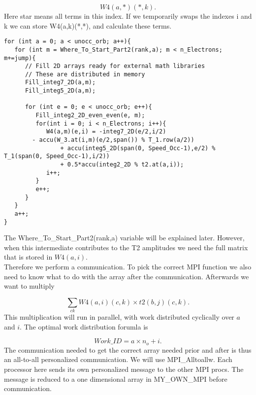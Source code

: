 \begin{equation}
W4(a,*)(*,k) .
\end{equation}
Here star means all terms in this index. If we temporarily swaps the indexes i and k we can store W4(a,k)(*,*), and calculate these terms.

\begin{lstlisting}
for (int a = 0; a < unocc_orb; a++){
   for (int m = Where_To_Start_Part2(rank,a); m < n_Electrons; m+=jump){
      // Fill 2D arrays ready for external math libraries
      // These are distributed in memory
      Fill_integ7_2D(a,m);
      Fill_integ5_2D(a,m);

      for (int e = 0; e < unocc_orb; e++){
         Fill_integ2_2D_even_even(e, m);
         for(int i = 0; i < n_Electrons; i++){
            W4(a,m)(e,i) = -integ7_2D(e/2,i/2)
        - accu(W_3.at(i,m)(e/2,span()) % T_1.row(a/2))
                + accu(integ5_2D(span(0, Speed_Occ-1),e/2) % T_1(span(0, Speed_Occ-1),i/2))
                + 0.5*accu(integ2_2D % t2.at(a,i));
            i++;
         }
         e++;
      }
   }
   a++;
}
\end{lstlisting}

The Where\_To\_Start\_Part2(rank,a) variable will be explained later. However, when this intermediate contributes to the T2 amplitudes we need the full matrix that is stored in $W4(a,i)$. \\

Therefore we perform a communication. To pick the correct MPI function we also need to know what to do with the array after the communication. Afterwards we want to multiply

\begin{equation}
\sum_{ck} W4(a,i)(c,k) \times t2(b,j)(c,k)   .\label{gasghashkashfbdbhcxxcnxcruu}
\end{equation}
This multiplication will run in parallel, with work distributed cyclically over $a$ and $i$. The optimal work distribution forumla is

\begin{equation}
Work\_ID = a \times n_o + i .
\end{equation}
The communication needed to get the correct array needed prior and after is thus an all-to-all personalized communication. We will use MPI\_Alltoallw. Each processor here sends its own personalized message to the other MPI procs. The message is reduced to a one dimensional array in MY\_OWN\_MPI before communication. \\

